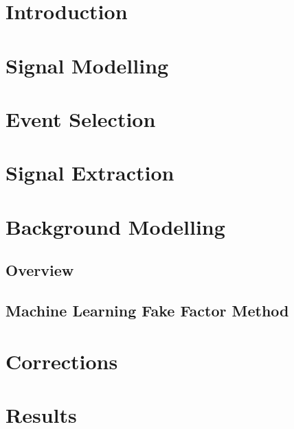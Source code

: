 \section{Introduction}
\section{Signal Modelling}
\section{Event Selection}
\section{Signal Extraction}
\section{Background Modelling}
\subsection{Overview}
\subsection{Machine Learning Fake Factor Method}
\section{Corrections}
\section{Results}
